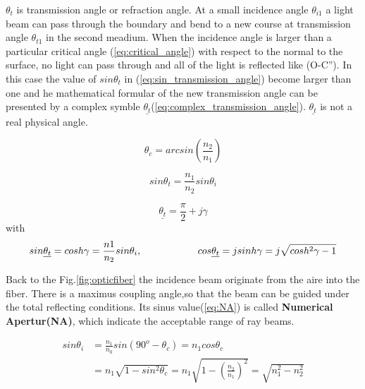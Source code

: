 $\theta_{t}$ is transmission angle or refraction angle.
At a small incidence angle $\theta_{i1}$ a light beam can pass through the boundary and bend to a new course at transmission angle $\theta_{t1}$ in the second meadium.
When the incidence angle is larger than a particular critical angle (\ref{eq:critical_angle}) with respect to the normal to the surface, no light can pass through and all of the light is reflected like (O-C''). In this case the value of $sin\theta_{t}$ in (\ref{eq:sin_transmission_angle}) become larger than one and he mathematical formular of the new transmission angle can be presented by a complex symble $\underline{\theta_{t}}$(\ref{eq:complex_transmission_angle}). $\underline{\theta_{t}}$ is not a real physical angle.

\begin{equation}
\theta_{c}=arcsin(\frac{n_{2}}{n_{1}})
\label{eq:critical_angle}
\end{equation}

\begin{equation}
sin\theta_{t}=\frac{n_{1}}{n_{2}}sin\theta_{i}
\label{eq:sin_transmission_angle}
\end{equation}

\begin{equation}
\underline{\theta_{t}}=\frac{\pi}{2}+j\gamma
\label{eq:complex_transmission_angle}
\end{equation}
with
\begin{equation}
sin\underline{\theta_{t}}=cosh\gamma=\frac{n{1}}{n_{2}}sin\theta_{i},\hspace{2cm}\hfill cos\underline{\theta_{t}}=jsinh\gamma=j\sqrt{cosh^2\gamma-1}
\label{eq:trangle_transmission_angle}
\end{equation}


Back to the Fig.\ref{fig:opticfiber} the incidence beam originate from the aire into the fiber. There is a maximus coupling angle,so that the beam can be guided under the total reflecting conditions. Its sinus value(\ref{eq:NA}) is called \textbf{Numerical Apertur(NA)}, which indicate the acceptable range of ray beams.

\begin{align}
sin\theta_{i}&=\frac{n_{1}}{n_{0}}sin(90^{o}-\theta_{c})=n_{1}cos\theta_{c} \nonumber\\
&=n_{1}\sqrt{1-sin^{2}\theta_{c}}=n_{1}\sqrt{1-\left(\frac{n_{2}}{n_{1}}\right)^2}=\sqrt{n^2_{1}-n^2_{2}}
\label{eq:NA}
\end{align}
